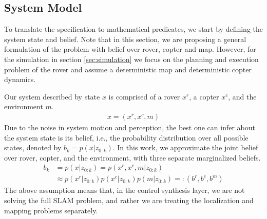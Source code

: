 \documentclass[conference]{IEEEtran}
\begin{document}
	
	\subsection{System Model}\label{sec:SysModel}
    To translate the specification to mathematical predicates, we start by defining the system state and belief. Note that in this section, we are proposing a general formulation of the problem with belief over rover, copter and map. However, for the simulation in section \ref{sec:simulation} we focus on the planning and execution problem of the rover and assume a deterministic map and deterministic copter dynamics.
    
    Our system described by state $x$ is comprised of a rover $x^r$, a copter $x^c$, and the environment $m$.
    \begin{align}
        x = (x^r, x^c, m) 
    \end{align}
    Due to the noise in system motion and perception, the best one can infer about the system state is its belief, i.e., the probability distribution over all possible states, denoted by $b_k=p(x|z_{0:k})$. In this work, we approximate the joint belief over rover, copter, and the environment, with three separate marginalized beliefs.
    \begin{align}
        \nonumber
        b_k &= p(x|z_{0:k})=p(x^r, x^c, m|z_{0:k})\\
        &\approx p(x^r|z_{0:k})p(x^c|z_{0:k})p(m|z_{0:k})=:(b^r, b^c, b^m)
    \end{align}
    The above assumption means that, in the control synthesis layer, we are not solving the full SLAM problem, and rather we are treating the localization and mapping problems separately. %
    
\end{document}
